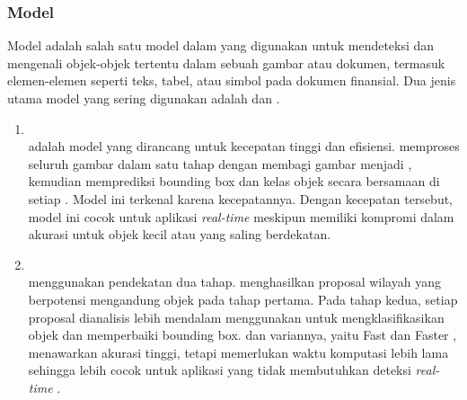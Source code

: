 \subsubsection{Model \objectdetection}
Model \objectdetection{} adalah salah satu model dalam \dl{} yang digunakan untuk mendeteksi dan mengenali objek-objek tertentu dalam sebuah gambar atau dokumen, termasuk elemen-elemen seperti teks, tabel, atau simbol pada dokumen finansial. Dua jenis utama model \objectdetection{} yang sering digunakan adalah \yolofull{} dan \rcnnfull{}.
	\begin{enumerate}
		\item \yolo~\\
		\yolo{} adalah model \objectdetection{} yang dirancang untuk kecepatan tinggi dan efisiensi. \yolo{} memproses seluruh gambar dalam satu tahap dengan membagi gambar menjadi \grid{}, kemudian memprediksi bounding box dan kelas objek secara bersamaan di setiap \grid{} \parencite{diwan2023object}. Model ini terkenal karena kecepatannya. Dengan kecepatan tersebut, model ini cocok untuk aplikasi \emph{real-time} meskipun memiliki kompromi dalam akurasi untuk objek kecil atau yang saling berdekatan.
		\item \rcnn~\\
		\rcnn{} menggunakan pendekatan dua tahap. \rcnn{} menghasilkan proposal wilayah yang berpotensi mengandung objek pada tahap pertama. Pada tahap kedua, setiap proposal dianalisis lebih mendalam menggunakan \cnn{} untuk mengklasifikasikan objek dan memperbaiki bounding box. \rcnn{} dan variannya, yaitu Fast \rcnn{} dan Faster \rcnn{}, menawarkan akurasi tinggi, tetapi memerlukan waktu komputasi lebih lama sehingga lebih cocok untuk aplikasi yang tidak membutuhkan deteksi \emph{real-time} \parencite{xie2021oriented}.
	\end{enumerate}